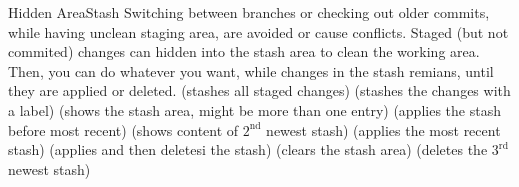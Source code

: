 \begin{frame}{Hidden Area}{Stash}
  {\footnotesize Switching between branches or checking out older commits, while having unclean staging area, 
  are avoided or cause conflicts. Staged (but not commited) changes can hidden into the stash area to clean the  working area. Then, you can do whatever 
you want, while changes in the stash remians, until they are applied or deleted.}
    (stashes all staged changes)
    (stashes the changes with a label)
   (shows the stash area, might be more than one entry)
   (applies the stash before most recent)
   (shows content of $2^{\text{nd}}$ newest stash)
   (applies the most recent stash)
   (applies and then deletesi the stash)
   (clears the stash area)
   (deletes the $3^\text{rd}$ newest stash)
\end{frame}
